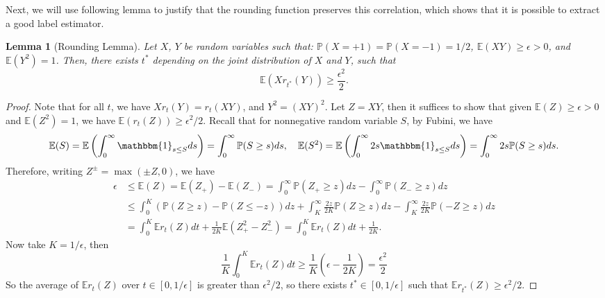\documentclass[11pt, titlepage]{article} %
\numberwithin{equation}{section}
\newtheorem{lemma}{Lemma}
\theoremstyle{definition}
\numberwithin{theorem}{section}
\numberwithin{lemma}{section}
\numberwithin{corollary}{section}
\numberwithin{proposition}{section}
\numberwithin{definition}{section}
\numberwithin{remark}{section}
\begin{document}
Next, we will use following lemma to justify that the rounding function
preserves this correlation, which shows that it is possible to extract a good label estimator.
\begin{lemma}[Rounding Lemma]
\label{lem:rounding}
Let $X$, $Y$ be random variables such that: $\mathbb{P}(X = +1) = \mathbb{P}(X = -1) = 1/2$, 
$\mathbb{E}(XY)\geq \epsilon > 0$, and $\mathbb{E}(Y^2) = 1$. Then, there exists $t^*$ depending 
on the joint distribution of $X$ and $Y$, such that
\[
\mathbb{E}(X r_{t^*}(Y)) \geq \frac{\epsilon^2}{2}.
\]
\end{lemma}
\begin{proof}
Note that for all $t$, we have $X r_t(Y) = r_t(XY)$, and $Y^2 = (XY)^2$. Let $Z = XY$, then it suffices to show
that given $\mathbb{E}(Z) \geq \epsilon > 0$ and $\mathbb{E}(Z^2) = 1$, we have $\mathbb{E}(r_t(Z)) \geq \epsilon^2/2$.
Recall that for nonnegative random variable $S$, by Fubini, we have
\[
\mathbb{E}(S) = \mathbb{E}\left(\int_{0}^{\infty}\mathbbm{1}_{s\leq S}ds\right) = \int_{0}^{\infty}\mathbb{P}(S\geq s)ds,\quad
\mathbb{E}(S^2) = \mathbb{E}\left(\int_{0}^{\infty}2s\mathbbm{1}_{s\leq S}ds\right) = \int_{0}^{\infty}2s\mathbb{P}(S\geq s)ds.
\]
Therefore, writing $Z^\pm = \max(\pm Z, 0)$, we have
\begin{align*}
\epsilon & \leq \mathbb{E} (Z) = \mathbb{E} (Z_+) - \mathbb{E} (Z_-) = \int_{0}^{\infty} \mathbb{P}(Z_+\geq z) dz - \int_{0}^{\infty} \mathbb{P}(Z_-\geq z) dz\\
& \leq \int_{0}^{K} (\mathbb{P}(Z\geq z) - \mathbb{P}(Z\leq -z))dz + \int_{K}^{\infty} \frac{2z}{2K} \mathbb{P}(Z\geq z) dz - \int_{K}^{\infty} \frac{2z}{2K} \mathbb{P}(-Z\geq z) dz\\
& = \int_{0}^{K} \mathbb{E}{r_t(Z)}dt + \frac{1}{2K}\mathbb{E}(Z_+^2 - Z_-^2) = \int_{0}^{K} \mathbb{E}{r_t(Z)}dt + \frac{1}{2K}.
\end{align*}
Now take $K = 1/\epsilon$, then
\[
\frac{1}{K}\int_{0}^{K} \mathbb{E}{r_t(Z)}dt \geq \frac{1}{K}(\epsilon - \frac{1}{2K}) = \frac{\epsilon^2}{2}
\]
So the average of $\mathbb{E}{r_t(Z)}$ over $t\in [0, 1/\epsilon]$ is greater than $\epsilon^2/2$,
so there exists $t^* \in [0, 1/\epsilon]$ such that $\mathbb{E}{r_{t^*}(Z)} \geq \epsilon^2/2$.
\end{proof}
\end{document}
